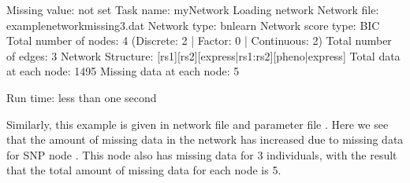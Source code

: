 \documentclass[letterpaper,10pt,english]{sphinxmanual}
\begin{document}
\begin{sphinxVerbatim}[commandchars=\\\{\}]
Missing value: not set
\PYGZhy{}\PYGZhy{}\PYGZhy{}\PYGZhy{}\PYGZhy{}\PYGZhy{}\PYGZhy{}\PYGZhy{}\PYGZhy{}\PYGZhy{}\PYGZhy{}\PYGZhy{}\PYGZhy{}\PYGZhy{}\PYGZhy{}\PYGZhy{}\PYGZhy{}\PYGZhy{}\PYGZhy{}\PYGZhy{}\PYGZhy{}\PYGZhy{}\PYGZhy{}\PYGZhy{}\PYGZhy{}\PYGZhy{}\PYGZhy{}\PYGZhy{}\PYGZhy{}\PYGZhy{}\PYGZhy{}\PYGZhy{}\PYGZhy{}\PYGZhy{}\PYGZhy{}\PYGZhy{}\PYGZhy{}\PYGZhy{}\PYGZhy{}\PYGZhy{}\PYGZhy{}\PYGZhy{}\PYGZhy{}\PYGZhy{}\PYGZhy{}\PYGZhy{}\PYGZhy{}\PYGZhy{}\PYGZhy{}\PYGZhy{}
\PYGZhy{}\PYGZhy{}\PYGZhy{}\PYGZhy{}\PYGZhy{}\PYGZhy{}\PYGZhy{}\PYGZhy{}\PYGZhy{}\PYGZhy{}\PYGZhy{}\PYGZhy{}\PYGZhy{}\PYGZhy{}\PYGZhy{}\PYGZhy{}\PYGZhy{}\PYGZhy{}\PYGZhy{}\PYGZhy{}\PYGZhy{}\PYGZhy{}\PYGZhy{}\PYGZhy{}\PYGZhy{}\PYGZhy{}\PYGZhy{}\PYGZhy{}\PYGZhy{}\PYGZhy{}\PYGZhy{}\PYGZhy{}\PYGZhy{}\PYGZhy{}\PYGZhy{}\PYGZhy{}\PYGZhy{}\PYGZhy{}\PYGZhy{}\PYGZhy{}\PYGZhy{}\PYGZhy{}\PYGZhy{}\PYGZhy{}\PYGZhy{}\PYGZhy{}\PYGZhy{}\PYGZhy{}\PYGZhy{}\PYGZhy{}
Task name: myNetwork
Loading network
Network file: example\PYGZhy{}network\PYGZhy{}missing3.dat
Network type: bnlearn
Network score type: BIC
Total number of nodes: 4 (Discrete: 2 | Factor: 0 | Continuous: 2)
Total number of edges: 3
Network Structure: [rs1][rs2][express|rs1:rs2][pheno|express]
Total data at each node: 1495
Missing data at each node: 5
\PYGZhy{}\PYGZhy{}\PYGZhy{}\PYGZhy{}\PYGZhy{}\PYGZhy{}\PYGZhy{}\PYGZhy{}\PYGZhy{}\PYGZhy{}\PYGZhy{}\PYGZhy{}\PYGZhy{}\PYGZhy{}\PYGZhy{}\PYGZhy{}\PYGZhy{}\PYGZhy{}\PYGZhy{}\PYGZhy{}\PYGZhy{}\PYGZhy{}\PYGZhy{}\PYGZhy{}\PYGZhy{}\PYGZhy{}\PYGZhy{}\PYGZhy{}\PYGZhy{}\PYGZhy{}\PYGZhy{}\PYGZhy{}\PYGZhy{}\PYGZhy{}\PYGZhy{}\PYGZhy{}\PYGZhy{}\PYGZhy{}\PYGZhy{}\PYGZhy{}\PYGZhy{}\PYGZhy{}\PYGZhy{}\PYGZhy{}\PYGZhy{}\PYGZhy{}\PYGZhy{}\PYGZhy{}\PYGZhy{}\PYGZhy{}

Run time: less than one second
\end{sphinxVerbatim}

\sphinxAtStartPar
Similarly, this example is given in network file  and parameter file .
Here we see that the amount of missing data in the network has increased due to missing data for SNP node .
This node also has missing data for 3 individuals, with the result that the total amount of missing data for each node is 5.
\end{document}
